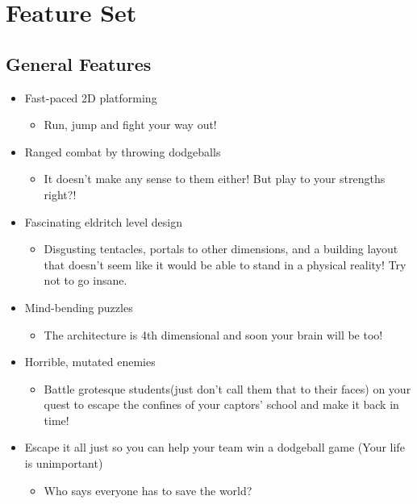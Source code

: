 \documentclass [12pt]{article}
\begin{document}
\section*{Feature Set}

\subsection*{General Features}

\begin{itemize}
\item Fast-paced 2D platforming
	\begin{itemize}
	\item Run, jump and fight your way out!
	\end{itemize}
\item Ranged combat by throwing dodgeballs
	\begin{itemize}
	\item It doesn't make any sense to them either! But play to your strengths right?!
	\end{itemize}
\item Fascinating eldritch level design
	\begin{itemize}
	\item Disgusting tentacles, portals to other dimensions, and a building layout that doesn't seem like it would be able to stand in a physical reality! Try not to go insane.
	\end{itemize}
\item Mind-bending puzzles
	\begin{itemize}
	\item The architecture is 4th dimensional and soon your brain will be too!
	\end{itemize}
\item Horrible, mutated enemies
	\begin{itemize}
	\item Battle grotesque students(just don't call them that to their faces) on your quest to escape the confines of your captors' school and make it back in time!
	\end{itemize}
\item Escape it all just so you can help your team win a dodgeball game (Your life is unimportant)
	\begin{itemize}
	\item Who says everyone has to save the world?
	\end{itemize}
\end{itemize}
\end{document}
